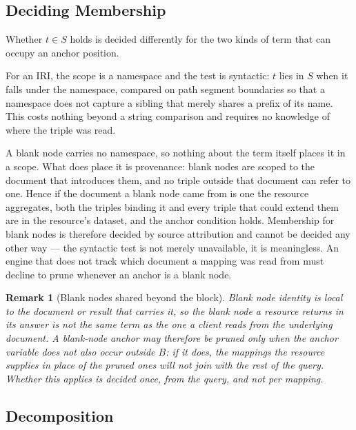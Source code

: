 \documentclass{article}
\newtheorem{remark}{Remark}
\begin{document}
\subsection*{Deciding Membership}

Whether $t \in S$ holds is decided differently for the two kinds of term that can occupy
an anchor position.

For an IRI, the scope is a namespace and the test is syntactic: $t$ lies in $S$ when it
falls under the namespace, compared on path segment boundaries so that a namespace does
not capture a sibling that merely shares a prefix of its name. This costs nothing beyond
a string comparison and requires no knowledge of where the triple was read.

A blank node carries no namespace, so nothing about the term itself places it in a scope.
What does place it is provenance: blank nodes are scoped to the document that introduces
them, and no triple outside that document can refer to one. Hence if the document a blank
node came from is one the resource aggregates, both the triples binding it and every
triple that could extend them are in the resource's dataset, and the anchor condition
holds. Membership for blank nodes is therefore decided by source attribution and cannot
be decided any other way --- the syntactic test is not merely unavailable, it is
meaningless. An engine that does not track which document a mapping was read from must
decline to prune whenever an anchor is a blank node.

\begin{remark}[Blank nodes shared beyond the block]
\label{rem:bnode}
Blank node identity is local to the document or result that carries it, so the blank node
a resource returns in its answer is not the same term as the one a client reads from the
underlying document. A blank-node anchor may therefore be pruned only when the anchor
variable does not also occur outside $B$: if it does, the mappings the resource supplies
in place of the pruned ones will not join with the rest of the query. Whether this applies
is decided once, from the query, and not per mapping.
\end{remark}

\subsection*{Decomposition}
\end{document}
